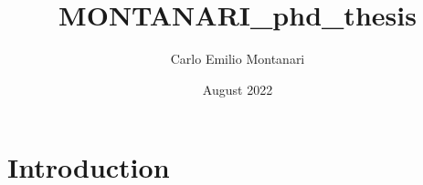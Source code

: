 \documentclass{article}
\title{MONTANARI_phd_thesis}
\author{Carlo Emilio Montanari}
\date{August 2022}
\begin{document}
\maketitle

\section{Introduction}
\end{document}
